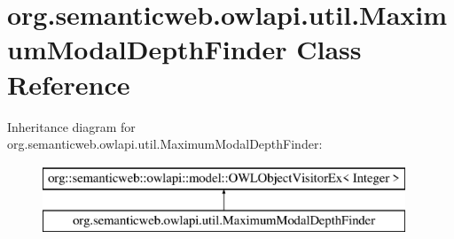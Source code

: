 \hypertarget{classorg_1_1semanticweb_1_1owlapi_1_1util_1_1_maximum_modal_depth_finder}{\section{org.\-semanticweb.\-owlapi.\-util.\-Maximum\-Modal\-Depth\-Finder Class Reference}
\label{classorg_1_1semanticweb_1_1owlapi_1_1util_1_1_maximum_modal_depth_finder}
}
Inheritance diagram for org.\-semanticweb.\-owlapi.\-util.\-Maximum\-Modal\-Depth\-Finder\-:\begin{figure}[H]
\begin{center}
\leavevmode
\includegraphics[height=2.000000cm]{classorg_1_1semanticweb_1_1owlapi_1_1util_1_1_maximum_modal_depth_finder}
\end{center}
\end{figure}
